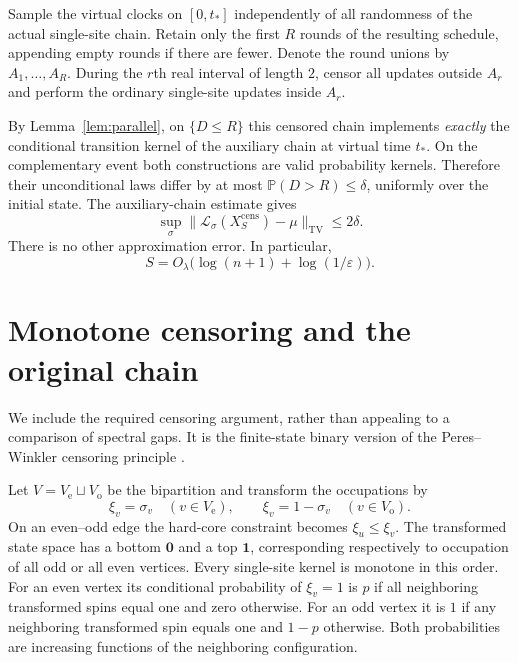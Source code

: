 \documentclass[11pt,reqno]{amsart}
\theoremstyle{remark}
\newcommand{\Prob}{\mathbb P}
\newcommand{\Law}{\mathcal L}
\newcommand{\TV}{\mathrm{TV}}
\numberwithin{equation}{section}
\begin{document}
Sample the virtual clocks on $[0,t_*]$ independently of all randomness of the actual single-site chain. Retain only the first $R$ rounds of the resulting schedule, appending empty rounds if there are fewer. Denote the round unions by $A_1,\ldots,A_R$. During the $r$th real interval of length $2$, censor all updates outside $A_r$ and perform the ordinary single-site updates inside $A_r$.

By Lemma~\ref{lem:parallel}, on $\{D\le R\}$ this censored chain implements \emph{exactly} the conditional transition kernel of the auxiliary chain at virtual time $t_*$. On the complementary event both constructions are valid probability kernels. Therefore their unconditional laws differ by at most $\Prob(D>R)\le\delta$, uniformly over the initial state. The auxiliary-chain estimate gives
\begin{equation}\label{eq:censored-mixing}
 \sup_\sigma\|\Law_\sigma(X_S^{\mathrm{cens}})-\mu\|_{\TV}
 \le2\delta.
\end{equation}
There is no other approximation error. In particular,
\begin{equation}\label{eq:real-time}
 S=O_\lambda\bigl(\log(n+1)+\log(1/\varepsilon)\bigr).
\end{equation}

\section{Monotone censoring and the original chain}

We include the required censoring argument, rather than appealing to a comparison of spectral gaps. It is the finite-state binary version of the Peres--Winkler censoring principle \cite{PW}.

Let $V=V_{\mathrm e}\sqcup V_{\mathrm o}$ be the bipartition and transform the occupations by
\[
 \xi_v=\sigma_v\quad(v\in V_{\mathrm e}),\qquad
 \xi_v=1-\sigma_v\quad(v\in V_{\mathrm o}).
\]
On an even--odd edge the hard-core constraint becomes $\xi_u\le\xi_v$. The transformed state space has a bottom $\mathbf0$ and a top $\mathbf1$, corresponding respectively to occupation of all odd or all even vertices. Every single-site kernel is monotone in this order. For an even vertex its conditional probability of $\xi_v=1$ is $p$ if all neighboring transformed spins equal one and zero otherwise. For an odd vertex it is $1$ if any neighboring transformed spin equals one and $1-p$ otherwise. Both probabilities are increasing functions of the neighboring configuration.
\end{document}
